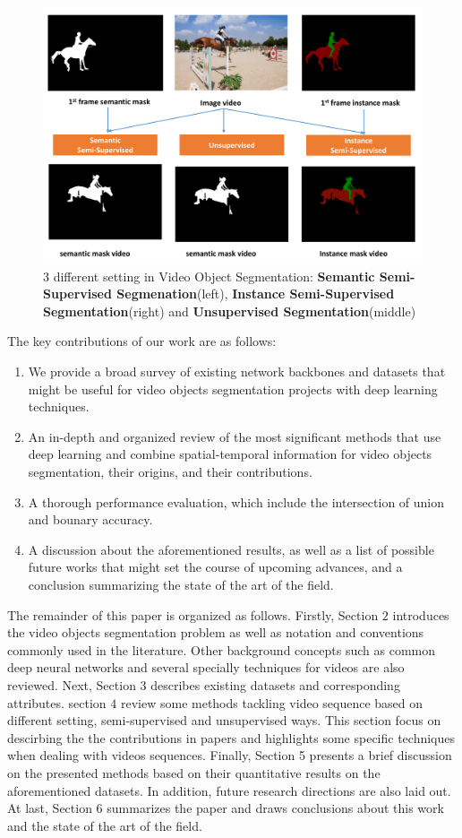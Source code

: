 \begin{figure}[ht]
    \centering
    \includegraphics[width=\textwidth]{./figure/VOS.png}
    \caption{3 different setting in Video Object Segmentation: \textbf{Semantic Semi-Supervised Segmenation}(left), \textbf{Instance Semi-Supervised Segmentation}(right) and \textbf{Unsupervised Segmentation}(middle)}
    \label{VOS}
\end{figure}


The key contributions of our work are as follows:
\begin{enumerate}
    \item  We provide a broad survey of existing network backbones and datasets that might be useful for video objects segmentation projects with deep learning techniques.
    \item  An in-depth and organized review of the most signiﬁcant methods that use deep learning and combine spatial-temporal information for video objects segmentation, 
           their origins, and their contributions.
    \item  A thorough performance evaluation, which include the intersection of union and bounary accuracy.
    \item  A discussion about the aforementioned results, as well as a list of possible future works that might set the course of upcoming advances,
           and a conclusion summarizing the state of the art of the ﬁeld.
\end{enumerate}


The remainder of this paper is organized as follows. Firstly, Section $2$ introduces the video objects segmentation problem as well as notation and conventions commonly used in the literature.
Other background concepts such as common deep neural networks and several specially techniques for videos are also reviewed. Next, Section 3 describes existing datasets and corresponding attributes.
section $4$ review some methods tackling video sequence based on different setting, semi-supervised and unsupervised ways. This section focus on descirbing the the contributions in papers and highlights some
specific techniques when dealing with videos sequences. Finally, Section 5 presents a brief discussion on the presented methods based on their quantitative results on the aforementioned datasets. 
In addition, future research directions are also laid out. At last, Section 6 summarizes the paper and draws conclusions about this work and the state of the art of the ﬁeld.
